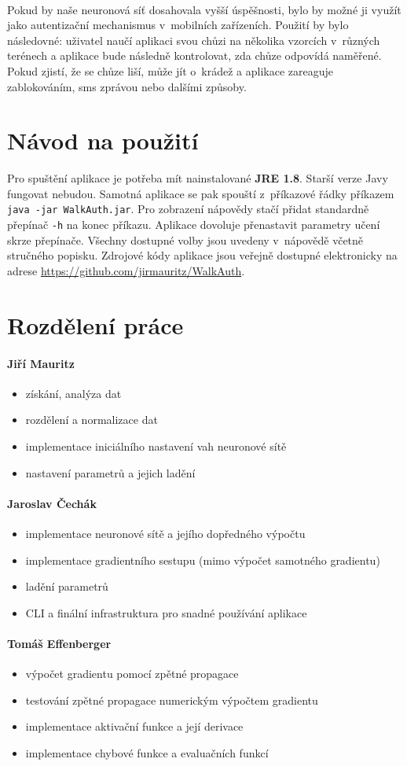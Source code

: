 \documentclass[a4paper, 10pt, twocolumn]{article}
\begin{document}
    \paragraph{}
    Pokud by naše neuronová síť dosahovala vyšší úspěšnosti, bylo by možné ji využít jako autentizační mechanismus v~mobilních zařízeních. Použití by bylo následovné: uživatel naučí aplikaci svou chůzi na několika vzorcích v~různých terénech a aplikace bude následně kontrolovat, zda chůze odpovídá naměřené. Pokud zjistí, že se chůze liší, může jít o~krádež a aplikace zareaguje zablokováním, sms zprávou nebo dalšími způsoby.
    
\appendix
\section{Návod na použití}
Pro spuštění aplikace je potřeba mít nainstalované \textbf{JRE 1.8}. Starší verze Javy fungovat nebudou. Samotná aplikace se pak spouští z~příkazové řádky příkazem \texttt{java -jar WalkAuth.jar}. Pro zobrazení nápovědy stačí přidat standardně přepínač \texttt{-h} na konec příkazu. Aplikace dovoluje přenastavit parametry učení skrze přepínače. Všechny dostupné volby jsou uvedeny v~nápovědě včetně stručného popisku. Zdrojové kódy aplikace jsou veřejně dostupné elektronicky na adrese \url{https://github.com/jirmauritz/WalkAuth}.

\section{Rozdělení práce}
\paragraph{Jiří Mauritz}
\begin{itemize}
  \item získání, analýza dat
  \item rozdělení a normalizace dat
  \item implementace iniciálního nastavení vah neuronové sítě
  \item nastavení parametrů a jejich ladění
\end{itemize}


\paragraph{Jaroslav Čechák}
\begin{itemize}
\item implementace neuronové sítě a jejího dopředného výpočtu
\item implementace gradientního sestupu (mimo výpočet samotného gradientu)
\item ladění parametrů
\item CLI a finální infrastruktura pro snadné používání aplikace
\end{itemize}

\paragraph{Tomáš Effenberger}
\begin{itemize}
\item výpočet gradientu pomocí zpětné propagace
\item testování zpětné propagace numerickým výpočtem gradientu
\item implementace aktivační funkce a její derivace
\item implementace chybové funkce a evaluačních funkcí
\end{itemize}
\end{document}
